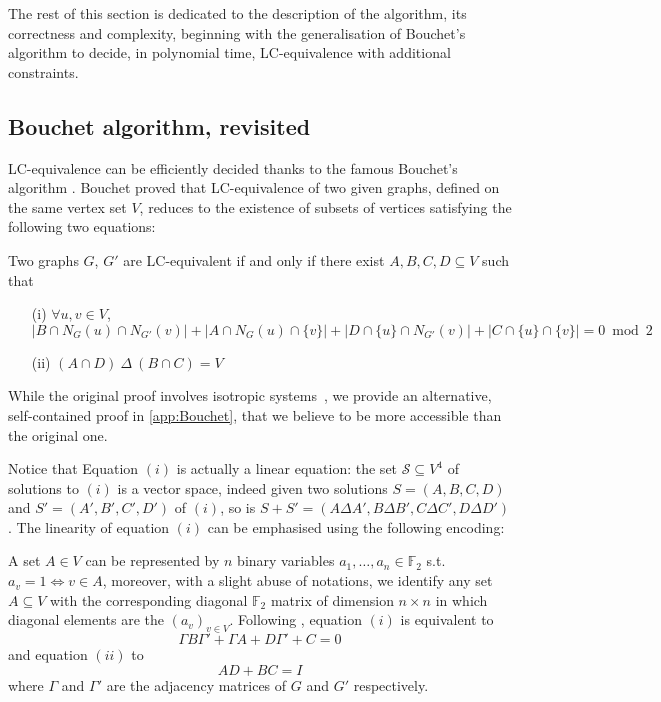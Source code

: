 \documentclass[a4paper,UKenglish,cleveref,autoref,thm-restate]{arxiv}
\begin{document}
The rest of this section is dedicated to the description of the algorithm, its correctness and complexity, beginning with the generalisation of Bouchet's algorithm to decide, in polynomial time, LC-equivalence with additional constraints.

\subsection{Bouchet algorithm, revisited} \label{subsec:bouchet}

LC-equivalence can be efficiently decided thanks to the famous Bouchet's algorithm \cite{Bouchet1991}. Bouchet proved that LC-equivalence of two given graphs, defined on the same vertex set $V$, reduces to the existence of subsets of vertices satisfying the following two equations:



\begin{proposition}{\bf \cite{Bouchet1991}} \label{prop:Bouchet}
Two graphs $G$, $G'$ are LC-equivalent if and only if there exist $A,B,C,D\subseteq V$ such that
\begin{itemize}
\item[(i)] $\forall u,v \in V$,\\
$|B\cap N_G(u)\cap N_{G'}(v)| + |A\cap N_G(u)\cap \{v\}| +  |D\cap \{u\}\cap N_{G'}(v)| + |C\cap \{u\}\cap \{v\}| = 0\bmod 2$
\item[(ii)]
$(A\cap D)~\Delta~ (B\cap C) = V$ 
\end{itemize}

\end{proposition}

While the original proof involves isotropic systems~\cite{bouchet1987}, we provide an alternative, self-contained proof in \cref{app:Bouchet}, that we believe to be more accessible than the original one.  

Notice that Equation $(i)$ is  actually a linear equation: the set $\mathcal S\subseteq V^4$ of solutions to  $(i)$ is a vector space, indeed given two solutions $S=(A,B,C,D)$ and $S'=(A',B',C',D')$ of $(i)$, so is $S+S'=(A\Delta A', B\Delta B', C\Delta C', D\Delta D')$. The linearity of equation $(i)$ can be emphasised using the following encoding: 

A set $A\in V$ can be represented by $n$ binary variables $a_1, \ldots, a_n\in \mathbb F_2$ s.t. $a_v=1 \Leftrightarrow v\in A$, moreover, with a slight abuse of notations, we identify any set $A\subseteq V$ with the corresponding diagonal $\mathbb F_2$ matrix of dimension $n\times n$ in which diagonal elements are the $(a_v)_{v\in V}$. Following \cite{VdnEfficientLC,Hein06}, equation $(i)$ is equivalent to 
\begin{equation}
\Gamma  B \Gamma' + \Gamma  A+  D\Gamma' +  C = 0
\end{equation}
and equation $(ii)$ to 
\begin{equation}
AD+BC=I
\end{equation}
where $\Gamma$ and $\Gamma'$ are the adjacency matrices of $G$ and $G'$ respectively.
\end{document}

